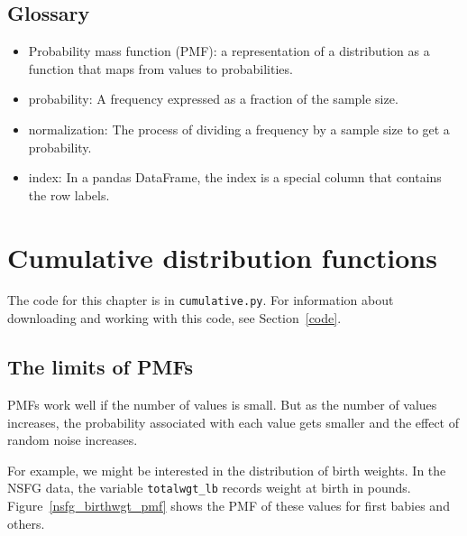 \documentclass[12pt]{book}
\begin{document}
\section{Glossary}

\begin{itemize}

\item Probability mass function (PMF): a representation of a distribution
as a function that maps from values to probabilities.

\item probability: A frequency expressed as a fraction of the sample
size.

\item normalization: The process of dividing a frequency by a sample
size to get a probability.

\item index: In a pandas DataFrame, the index is a special column
that contains the row labels.

\end{itemize}


\chapter{Cumulative distribution functions}
\label{cumulative}

The code for this chapter is in {\tt cumulative.py}.
For information about downloading and
working with this code, see Section~\ref{code}.


\section{The limits of PMFs}

PMFs work well if the number of values is small.  But as the number of
values increases, the probability associated with each value gets
smaller and the effect of random noise increases.

For example, we might be interested in the distribution of birth
weights.  In the NSFG data, the variable \verb"totalwgt_lb" records
weight at birth in pounds.  Figure~\ref{nsfg_birthwgt_pmf} shows
the PMF of these values for first babies and others.
  
\end{document}
